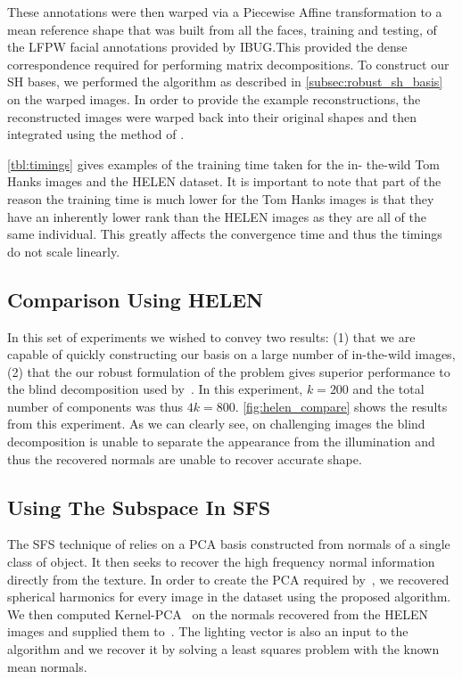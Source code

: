 These annotations were then warped via a Piecewise Affine transformation to a
mean reference shape that was built from all the faces, training and testing, of
the LFPW facial annotations provided by IBUG.\@ This provided the dense
correspondence required for performing matrix decompositions. To construct our
SH bases, we performed the algorithm as described in
\cref{subsec:robust_sh_basis} on the warped images. In order to provide
the example reconstructions, the reconstructed images were warped back into
their original shapes and then integrated using the method of 
\citet{frankot1988method}.

\cref{tbl:timings} gives examples of the training time taken for the in-
the-wild Tom Hanks images and the HELEN dataset. It is important to note that
part of the reason the training time is much lower for the Tom Hanks images is
that they have an inherently lower rank than the HELEN images as they are all of
the same individual. This greatly affects the convergence time and thus the
timings do not scale linearly.
\subsection{Comparison Using HELEN}\label{subsec:experiments_helen}
In this set of experiments we wished to convey two results: (1) that we are
capable of quickly constructing our basis on a large number of in-the-wild
images, (2) that the our robust formulation of the problem gives superior
performance to the blind decomposition used by~\cite{KemelmacherShlizerman:2013iv}. In this
experiment, $k = 200$ and the total number of components was thus $4k = 800$.
\cref{fig:helen_compare} shows the results from this experiment. As we can
clearly see, on challenging images the blind decomposition is unable to separate
the appearance from the illumination and thus the recovered normals are unable
to recover accurate shape.
\subsection{Using The Subspace In SFS}\label{subsec:experiments_smith}
The SFS technique of \citet{smith2006recovering} relies on a PCA basis
constructed from normals of a single class of object. It then seeks to recover
the high frequency normal information directly from the texture. In order to
create the PCA required by~\cite{smith2006recovering}, we recovered spherical harmonics
for every image in the dataset using the proposed algorithm. We then computed
Kernel-PCA~\cite{Snape:2014de} on the normals recovered from the HELEN images
and supplied them to~\cite{smith2006recovering}. The lighting vector is also an input to
the algorithm and we recover it by solving a least squares problem with the
known mean normals.

